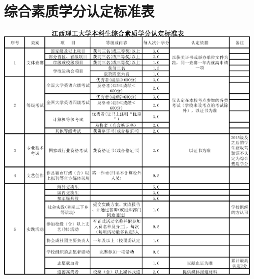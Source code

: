 \documentclass[UTF8]{ctexart}
\theoremstyle{nonumberplain}
\theoremstyle{nonumberplain}
\begin{document}
    \newpage
    \appendix
    \section{综合素质学分认定标准表}\label{fl:1}
    \begin{center}
        \includegraphics[width=\textwidth]{zhsz}
    \end{center}
\end{document}
